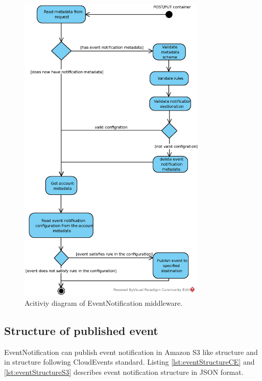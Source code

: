     \begin{figure}[hbt]
        \centering
        \includegraphics[width=0.8\textwidth]{obrazky-figures/middleware-activity-diagram.eps}
        \caption{Acitiviy diagram of EventNotification middleware.}
        \label{fig:middlewareActivity}
    \end{figure}

    \subsection{Structure of published event}
    EventNotification can publish event notification in Amazon S3 like structure and in structure following CloudEvents standard. Listing \ref{lst:eventStructureCE} and \ref{lst:eventStructureS3} describes event notification structure in JSON format.

